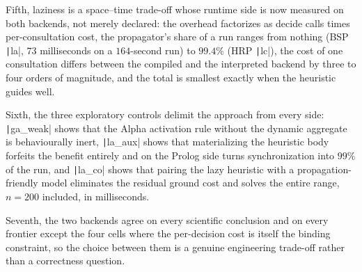 Fifth, laziness is a space--time trade-off whose runtime side is now measured on both backends, not merely declared: the overhead factorizes as decide calls times per-consultation cost, the propagator's share of a run ranges from nothing (BSP \texttt|la|, $73$ milliseconds on a $164$-second run) to $99.4\%$ (HRP \texttt|lc|), the cost of one consultation differs between the compiled and the interpreted backend by three to four orders of magnitude, and the total is smallest exactly when the heuristic guides well.

Sixth, the three exploratory controls delimit the approach from every side: \texttt|ga_weak| shows that the Alpha activation rule without the dynamic aggregate is behaviourally inert, \texttt|la_aux| shows that materializing the heuristic body forfeits the benefit entirely and on the Prolog side turns synchronization into $99\%$ of the run, and \texttt|la_co| shows that pairing the lazy heuristic with a propagation-friendly model eliminates the residual ground cost and solves the entire range, $n=200$ included, in milliseconds.

Seventh, the two backends agree on every scientific conclusion and on every frontier except the four cells where the per-decision cost is itself the binding constraint, so the choice between them is a genuine engineering trade-off rather than a correctness question.
